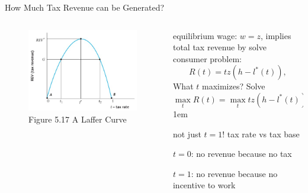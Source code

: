 \documentclass[11pt,aspectratio=43]{beamer}
\newcommand{\jump}[2]{\hyperlink{#1}{\beamerbutton{#2}}}
\let\olditemize=\itemize
\let\endolditemize=\enditemize
\renewenvironment{itemize}{\olditemize \itemsep1em}{\endolditemize}
\theoremstyle{definition}
\begin{document}
\begin{frame}{How Much Tax Revenue can be Generated?}
\label{slide:How_Much_Tax_Revenue_can_be_Generated_}
    \begin{columns}
        \begin{column}{0.5\textwidth}
            \begin{figure}
                \caption{\scriptsize Figure 5.17  A Laffer Curve}
                \includegraphics[width=\textwidth]{./figures/Figure_5_17.jpg}
            \end{figure}
            \jump{slide:Multiple_Competitive_Equilibria_Possible}{Back}
        \end{column}
        \begin{column}{0.5\textwidth}
            \small
            equilibrium wage: $ w = z $, implies \alert{total tax revenue} by solve consumer problem:
            \begin{equation*}
                R( t ) = tz( h - l^{*}( t ) )
            ,\end{equation*}
            What $ t $ maximizes? Solve
            \begin{equation*}
               \max_{t} R( t ) = \max_{t} tz( h - l^{*}( t ) )
            ,\end{equation*}
            \begin{itemize}
                \item not just $ t = 1 $! tax \alert{rate } vs tax \alert{base}
                \item $ t = 0 $: no revenue because no tax
                \item $ t = 1 $: no revenue because no incentive to work
            \end{itemize}
        \end{column}
    \end{columns}
\end{frame}
\end{document}

